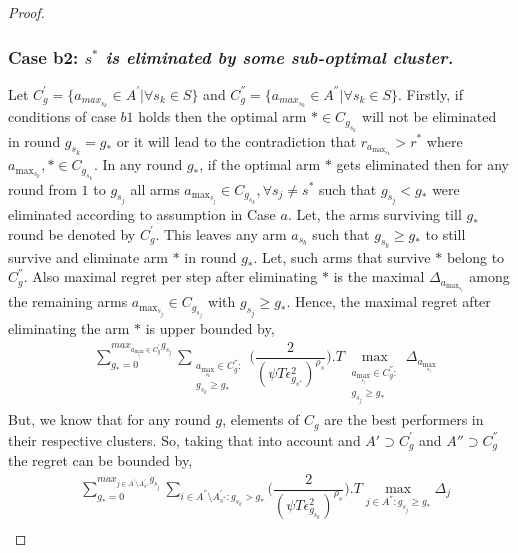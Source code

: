 \begin{proof}
\subsubsection*{Case b2: \textit{$s^{*}$ is eliminated by some sub-optimal cluster.} } 
	
	Let $C_{g}^{'}=\lbrace a_{max_{s_{k}}}\in A^{'}|\forall s_{k}\in S \rbrace$ and $C_{g}^{''}=\lbrace a_{max_{s_{k}}}\in A^{''}|\forall s_{k}\in S \rbrace$. Firstly, if conditions of case $b1$ holds then the optimal arm ${*}\in C_{g_{s_{k}}}$ will not be eliminated in round $g_{s_{k}}=g_{*}$ or it will lead to the contradiction that $r_{a_{\max_{s_{k}}}}>r^{*}$ where $a_{\max_{s_{k}}},{*}\in C_{g_{s_{k}}}$. In any round $g_{*}$, if the optimal arm ${*}$ gets eliminated then for any round from $1$ to $g_{s_{j}}$ all arms $a_{\max_{s_{j}}}\in C_{g_{s_{k}}},\forall s_{j}\neq s^{*}$ such that $g_{s_{j}}< g_{*}$ were eliminated according to assumption in Case $a$. Let, the arms surviving till $g_{*}$ round be denoted by $C_{g}^{'}$. This leaves any arm $a_{s_{b}}$ such that $g_{s_{b}}\geq g_{*}$ to still survive and eliminate arm ${*}$ in round $g_{*}$. Let, such arms that survive ${*}$ belong to $C_{g}^{''}$. Also maximal regret per step after eliminating ${*}$ is the maximal $\Delta_{a_{\max_{s_{j}}}}$ among the remaining arms ${a_{\max_{s_{j}}}}\in C_{g_{s_{j}}}$ with $g_{s_{j}}\geq g_{*}$. Hence, the maximal regret after eliminating the arm ${*}$ is upper bounded by, 
 \begin{align*}
 &\sum_{g_{*}=0}^{max_{a_{\max_{s_{j}}}\in C_{g}^{'}}g_{s_{j}}}\sum_{\substack{a_{\max_{s_{k}}}\in C_{g}^{''}: \\ g_{s_{k}} \geq g_{*}}}\bigg(\dfrac{2}{(\psi T\epsilon_{g_{s^{*}}}^{2})^{\rho_{s}}} \bigg).T\max_{\substack{a_{\max_{s_{j}}}\in C_{g}^{''}: \\ g_{s_{j}}\geq g_{*}}}{\Delta}_{a_{\max_{s_{j}}}}
 \end{align*}
But, we know that for any round $g$, elements of $C_{g}$ are the best performers in their respective clusters. So, taking that into account and $A'\supset C_{g}^{'}$ and $A''\supset C_{g}^{''}$ the regret can be bounded by,
\begin{align*}
 & \sum_{g_{*}=0}^{max_{j\in A^{'}\setminus A_{s^*}^{'}}g_{s_{j}}}\sum_{i\in A^{''}\setminus A_{s^*}^{'}:g_{s_{k}}>g_{*}}\bigg(\dfrac{2}{(\psi T\epsilon_{g_{s_{k}}}^{2})^{\rho_{s}}} \bigg).T\max_{j\in A^{''}:g_{s_{j}}\geq g_{*}}{\Delta}_{j}\\

\end{align*}
\end{proof}

